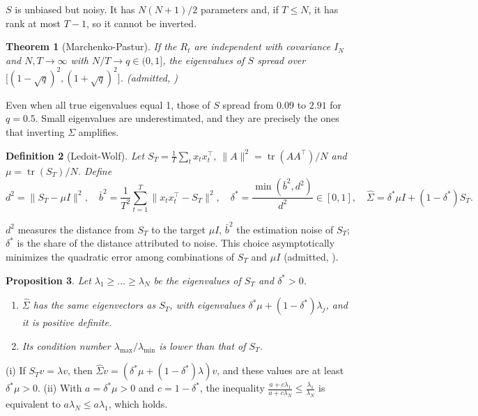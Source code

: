 \documentclass[11pt,a4paper]{article}
\makeatletter
\theoremstyle{pdef}
\newtheorem{definition}{Definition}[section]
\theoremstyle{pstate}
\newtheorem{proposition}[definition]{Proposition}
\newtheorem{theorem}[definition]{Theorem}
\renewenvironment{proof}[1][\proofname]{\par\pushQED{\qed}\normalfont
  \topsep6pt\trivlist\item[\hskip\labelsep{\sffamily\bfseries #1.}]\ignorespaces}
  {\popQED\endtrivlist\@endpefalse}
\newcommand{\admitted}[1]{{\upshape\small\color{ink2}(admitted, #1)}}
\newcommand{\T}{^{\top}}
\DeclareMathOperator{\tr}{tr}
\makeatother
\begin{document}
$S$ is unbiased but noisy. It has $N(N+1)/2$ parameters and, if $T\le N$, it has rank at
most $T-1$, so it cannot be inverted.

\begin{theorem}[Marchenko-Pastur]\label{thm:mp}
If the $R_t$ are independent with covariance $I_N$ and $N,T\to\infty$ with
$N/T\to q\in(0,1]$, the eigenvalues of $S$ spread over
$\bigl[(1-\sqrt q)^2,(1+\sqrt q)^2\bigr]$. \admitted{\citealp{marchenko1967}}
\end{theorem}

Even when all true eigenvalues equal 1, those of $S$ spread from $0.09$ to $2.91$ for
$q=0.5$. Small eigenvalues are underestimated, and they are precisely the ones that
inverting $\Sigma$ amplifies.

\begin{definition}[Ledoit-Wolf]
Let $S_T=\frac1T\sum_tx_tx_t\T$, $\lVert A\rVert^2=\tr(AA\T)/N$ and $\mu=\tr(S_T)/N$.
Define
\[
d^2=\lVert S_T-\mu I\rVert^2,\quad
\bar b^2=\frac1{T^2}\sum_{t=1}^T\lVert x_tx_t\T-S_T\rVert^2,\quad
\delta^\ast=\frac{\min(\bar b^2,d^2)}{d^2}\in[0,1],\quad
\hat\Sigma=\delta^\ast\mu I+(1-\delta^\ast)S_T .
\]
\end{definition}

$d^2$ measures the distance from $S_T$ to the target $\mu I$, $\bar b^2$ the estimation
noise of $S_T$; $\delta^\ast$ is the share of the distance attributed to noise. This
choice asymptotically minimizes the quadratic error among combinations of $S_T$ and
$\mu I$ \admitted{\citealp{ledoitwolf2004}}.

\begin{proposition}\label{prop:lw}
Let $\lambda_1\ge\dots\ge\lambda_N$ be the eigenvalues of $S_T$ and $\delta^\ast>0$.
\begin{enumerate}[label=(\roman*)]
\item $\hat\Sigma$ has the same eigenvectors as $S_T$, with eigenvalues
$\delta^\ast\mu+(1-\delta^\ast)\lambda_j$, and it is positive definite.
\item Its condition number $\lambda_{\max}/\lambda_{\min}$ is lower than that of $S_T$.
\end{enumerate}
\end{proposition}

\begin{proof}
(i) If $S_Tv=\lambda v$, then $\hat\Sigma v=(\delta^\ast\mu+(1-\delta^\ast)\lambda)v$, and
these values are at least $\delta^\ast\mu>0$.
(ii) With $a=\delta^\ast\mu>0$ and $c=1-\delta^\ast$, the inequality
$\frac{a+c\lambda_1}{a+c\lambda_N}\le\frac{\lambda_1}{\lambda_N}$ is equivalent to
$a\lambda_N\le a\lambda_1$, which holds.
\end{proof}
\end{document}
